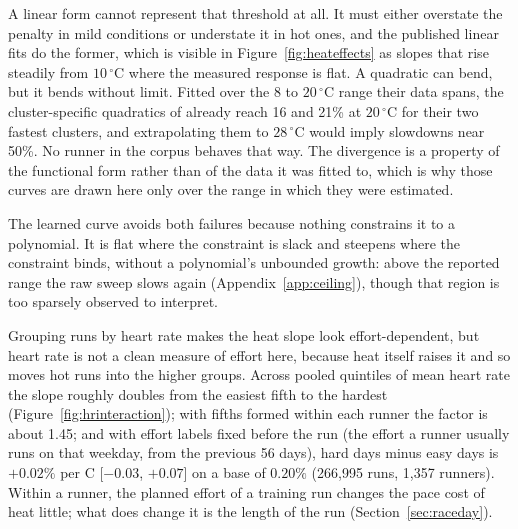 \documentclass[11pt]{article}
\renewcommand{\_}{\textunderscore\allowbreak}
\begin{document}
A linear form cannot represent that threshold at all. It must either overstate the penalty in mild conditions or understate it in hot ones, and the published linear fits do the former, which is visible in Figure~\ref{fig:heateffects} as slopes that rise steadily from $10\,^{\circ}$C where the measured response is flat. A quadratic can bend, but it bends without limit. Fitted over the 8 to $20\,^{\circ}$C range their data spans, the cluster-specific quadratics of \citet{gasparetto2020} already reach 16 and 21\% at $20\,^{\circ}$C for their two fastest clusters, and extrapolating them to $28\,^{\circ}$C would imply slowdowns near 50\%. No runner in the corpus behaves that way. The divergence is a property of the functional form rather than of the data it was fitted to, which is why those curves are drawn here only over the range in which they were estimated.

The learned curve avoids both failures because nothing constrains it to a polynomial. It is flat where the constraint is slack and steepens where the constraint binds, without a polynomial's unbounded growth: above the reported range the raw sweep slows again (Appendix~\ref{app:ceiling}), though that region is too sparsely observed to interpret.

Grouping runs by heart rate makes the heat slope look effort-dependent, but heart rate is not a clean measure of effort here, because heat itself raises it and so moves hot runs into the higher groups. Across pooled quintiles of mean heart rate the slope roughly doubles from the easiest fifth to the hardest (Figure~\ref{fig:hrinteraction}); with fifths formed within each runner the factor is about 1.45; and with effort labels fixed before the run (the effort a runner usually runs on that weekday, from the previous 56 days), hard days minus easy days is $+0.02\%$ per \textdegree C [$-0.03$, $+0.07$] on a base of $0.20\%$ (266{,}995 runs, 1{,}357 runners). Within a runner, the planned effort of a training run changes the pace cost of heat little; what does change it is the length of the run (Section~\ref{sec:raceday}).
\end{document}
